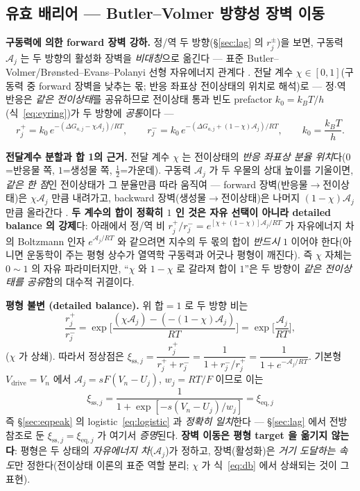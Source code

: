 \documentclass[11pt,a4paper]{article}
\newcommand{\eq}{\mathrm{eq}}
\newcommand{\drive}{\mathrm{drive}}
\newcommand{\sstat}{\mathrm{ss}}
\begin{document}
\subsection{유효 배리어 — Butler--Volmer 방향성 장벽 이동}
\textbf{구동력에 의한 forward 장벽 강하.} 정/역 두 방향(\S\ref{sec:lag} 의 $r_j^\pm$)을 보면, 구동력 $\mathcal A_j$ 는
두 방향의 활성화 장벽을 \emph{비대칭}으로 옮긴다 — 표준 Butler--Volmer/Brønsted--Evans--Polanyi 선형 자유에너지
관계다 \cite{bardfaulkner,evanspolanyi1938}. 전달 계수 $\chi\in[0,1]$(구동력 중 forward 장벽을 낮추는 몫; 반응
좌표상 전이상태의 위치로 해석)로 — 정$\cdot$역 반응은 \emph{같은 전이상태}를 공유하므로 전이상태 통과 빈도
prefactor $k_0=k_BT/h$(식~\eqref{eq:eyring})가 두 방향에 \emph{공통}이다 —
\begin{equation}
r_j^+=k_0\,e^{-(\Delta G_{a,j}-\chi\mathcal A_j)/RT},\qquad
r_j^-=k_0\,e^{-(\Delta G_{a,j}+(1-\chi)\mathcal A_j)/RT},\qquad k_0=\frac{k_BT}{h}.
\label{eq:bv}
\end{equation}

\textbf{전달계수 분할과 합 1의 근거.} 전달 계수 $\chi$ 는 전이상태의 \emph{반응 좌표상 분율
위치}다($0$=반응물 쪽, $1$=생성물 쪽, $\tfrac12$=가운데). 구동력 $\mathcal A_j$ 가 두 우물의 상대 높이를
기울이면, \emph{같은 한 점}인 전이상태가 그 분율만큼 따라 움직여 — forward 장벽(반응물$\to$전이상태)은
$\chi\mathcal A_j$ 만큼 내려가고, backward 장벽(생성물$\to$전이상태)은 나머지 $(1-\chi)\mathcal A_j$ 만큼 올라간다
\cite{evanspolanyi1938,bardfaulkner}. \textbf{두 계수의 합이 정확히 $1$ 인 것은 자유 선택이 아니라 detailed
balance 의 강제}다: 아래에서 정/역 비 $r_j^+/r_j^-=e^{[\chi+(1-\chi)]\mathcal A_j/RT}$ 가 자유에너지 차의
Boltzmann 인자 $e^{\mathcal A_j/RT}$ 와 같으려면 지수의 두 몫의 합이 \emph{반드시} $1$ 이어야 한다(아니면
운동학이 주는 평형 상수가 열역학 구동력과 어긋나 평형이 깨진다). 즉 $\chi$ 자체는 $0\!\sim\!1$ 의 자유
파라미터지만, ``$\chi$ 와 $1-\chi$ 로 갈라져 합이 $1$''은 두 방향이 \emph{같은 전이상태를 공유}함의 대수적
귀결이다.

\textbf{평형 불변 (detailed balance).} 위 합$=1$ 로 두 방향 비는
\begin{equation}
\frac{r_j^+}{r_j^-}=\exp\!\Big[\frac{(\chi\mathcal A_j)-(-(1-\chi)\mathcal A_j)}{RT}\Big]
=\exp\!\Big[\frac{\mathcal A_j}{RT}\Big],
\label{eq:db}
\end{equation}
($\chi$ 가 상쇄). 따라서 정상점은 $\xi_{\sstat,j}=\dfrac{r_j^+}{r_j^++r_j^-}=\dfrac{1}{1+r_j^-/r_j^+}
=\dfrac{1}{1+e^{-\mathcal A_j/RT}}$. 기본형 $V_\drive=V_n$ 에서 $\mathcal A_j=sF(V_n-U_j)$, $w_j=RT/F$ 이므로 이는
\begin{equation}
\xi_{\sstat,j}=\frac{1}{1+\exp[-s(V_n-U_j)/w_j]}=\xi_{\eq,j}
\label{eq:sseq}
\end{equation}
즉 \S\ref{sec:eqpeak} 의 logistic~\eqref{eq:logistic} 과 \emph{정확히 일치}한다 — \S\ref{sec:lag} 에서 전방참조로
둔 $\xi_{\sstat,j}=\xi_{\eq,j}$ 가 여기서 \emph{증명}된다. \textbf{장벽 이동은 평형 target 을 옮기지 않는다}: 평형은 두
상태의 \emph{자유에너지 차}($\mathcal A_j$)가 정하고, 장벽(활성화)은 \emph{거기 도달하는 속도}만 정한다(전이상태
이론의 표준 역할 분리; $\chi$ 가 식~\eqref{eq:db} 에서 상쇄되는 것이 그 표현).
\end{document}
